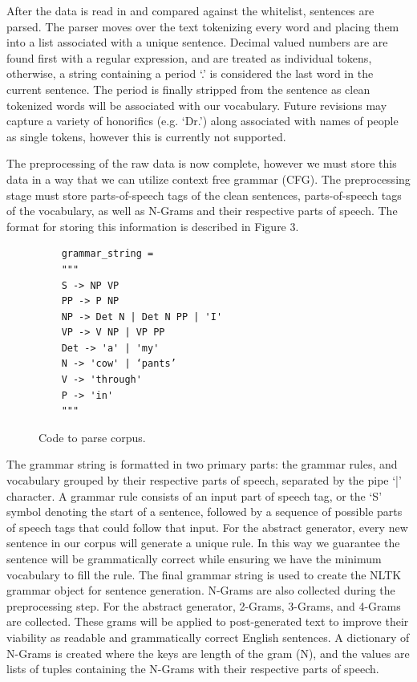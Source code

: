 \documentclass[letterpaper, 10 pt, conference]{ieeeconf}  %
\begin{document}
After the data is read in and compared against the whitelist, sentences are parsed. The parser moves over the text tokenizing every word and placing them into a list associated with a unique sentence. Decimal valued numbers are are found first with a regular expression, and are treated as individual tokens, otherwise, a string containing a period ‘.’ is considered the last word in the current sentence. The period is finally stripped from the sentence as clean tokenized words will be associated with our vocabulary. Future revisions may capture a variety of honorifics (e.g. ‘Dr.’) along associated with names of people as single tokens, however this is currently not supported.

The preprocessing of the raw data is now complete, however we must store this data in a way that we can utilize context free grammar (CFG). The preprocessing stage must store parts-of-speech tags of the clean sentences, parts-of-speech tags of the vocabulary, as well as N-Grams and their respective parts of speech. The format for storing this information is described in Figure 3.

\begin{figure}[!ht]
	\begin{verbatim}
	grammar_string = 
	""" 
	S -> NP VP
	PP -> P NP
	NP -> Det N | Det N PP | 'I'
	VP -> V NP | VP PP
	Det -> 'a' | 'my'
	N -> 'cow' | ‘pants’
	V -> 'through'
	P -> 'in'
	"""
	\end{verbatim}
	\caption{Code to parse corpus.}
	\label{fig:gramstring}
\end{figure}

The grammar string is formatted in two primary parts: the grammar rules, and vocabulary grouped by their respective parts of speech, separated by the pipe ‘|’ character. A grammar rule consists of an input part of speech tag, or the ‘S’ symbol denoting the start of a sentence, followed by a sequence of possible parts of speech tags that could follow that input. For the abstract generator, every new sentence in our corpus will generate a unique rule. In this way we guarantee the sentence will be grammatically correct while ensuring we have the minimum vocabulary to fill the rule. The final grammar string is used to create the NLTK grammar object for sentence generation. 
N-Grams are also collected during the preprocessing step. For the abstract generator, 2-Grams, 3-Grams, and 4-Grams are collected. These grams will be applied to post-generated text to improve their viability as readable and grammatically correct English sentences. A dictionary of N-Grams is created where the keys are  length of the gram (N), and the values are lists of tuples containing the N-Grams with their respective parts of speech.
\end{document}
